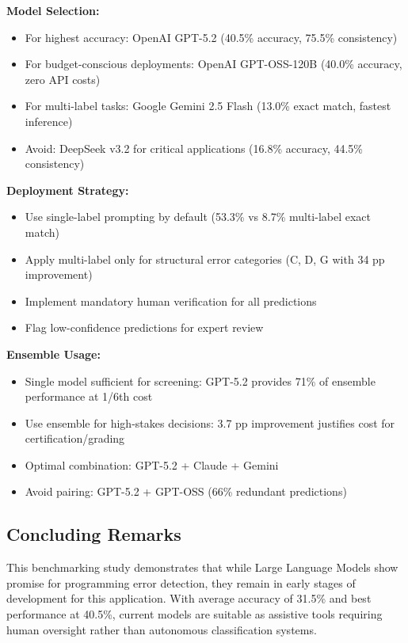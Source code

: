\documentclass[12pt,a4paper]{article}
\begin{document}
\textbf{Model Selection:}
\begin{itemize}[leftmargin=*]
    \item For highest accuracy: OpenAI GPT-5.2 (40.5\% accuracy, 75.5\% consistency)
    \item For budget-conscious deployments: OpenAI GPT-OSS-120B (40.0\% accuracy, zero API costs)
    \item For multi-label tasks: Google Gemini 2.5 Flash (13.0\% exact match, fastest inference)
    \item Avoid: DeepSeek v3.2 for critical applications (16.8\% accuracy, 44.5\% consistency)
\end{itemize}

\textbf{Deployment Strategy:}
\begin{itemize}[leftmargin=*]
    \item Use single-label prompting by default (53.3\% vs 8.7\% multi-label exact match)
    \item Apply multi-label only for structural error categories (C, D, G with 34 pp improvement)
    \item Implement mandatory human verification for all predictions
    \item Flag low-confidence predictions for expert review
\end{itemize}

\textbf{Ensemble Usage:}
\begin{itemize}[leftmargin=*]
    \item Single model sufficient for screening: GPT-5.2 provides 71\% of ensemble performance at 1/6th cost
    \item Use ensemble for high-stakes decisions: 3.7 pp improvement justifies cost for certification/grading
    \item Optimal combination: GPT-5.2 + Claude + Gemini
    \item Avoid pairing: GPT-5.2 + GPT-OSS (66\% redundant predictions)
\end{itemize}

\subsection{ Concluding Remarks}

This benchmarking study demonstrates that while Large Language Models show promise for programming error detection, they remain in early stages of development for this application. With average accuracy of 31.5\% and best performance at 40.5\%, current models are suitable as assistive tools requiring human oversight rather than autonomous classification systems.

\end{document}

